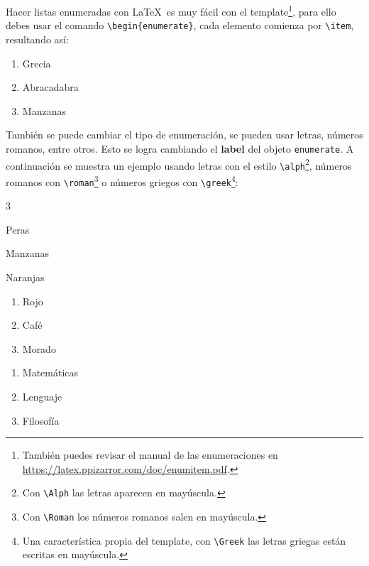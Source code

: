 

	Hacer listas enumeradas con \LaTeX\ es muy fácil con el template\footnote{También puedes revisar el manual de las enumeraciones en \url{https://latex.ppizarror.com/doc/enumitem.pdf}.}, para ello debes usar el comando \texttt{\textbackslash begin\{enumerate\}}, cada elemento comienza por \texttt{\textbackslash item}, resultando así:

	\begin{enumerate}
		\item Grecia
		\item Abracadabra
		\item Manzanas
	\end{enumerate}

	También se puede cambiar el tipo de enumeración, se pueden usar letras, números romanos, entre otros. Esto se logra cambiando el \textbf{label} del objeto \texttt{enumerate}. A continuación se muestra un ejemplo usando letras con el estilo \texttt{\textbackslash alph}\footnote{Con \texttt{\textbackslash Alph} las letras aparecen en mayúscula.}, números romanos con \texttt{\textbackslash roman}\footnote{Con \texttt{\textbackslash Roman} los números romanos salen en mayúscula.} o números griegos con \texttt{\textbackslash greek}\footnote{Una característica propia del template, con \texttt{\textbackslash Greek} las letras griegas están escritas en mayúscula.}:

	\begin{multicols}{3}
		\begin{enumeratebf}[label=\alph*) ] %
			\item Peras
			\item Manzanas
			\item Naranjas
		\end{enumeratebf}

		\begin{enumerate}[label=\roman*) ]
			\item Rojo
			\item Café
			\item Morado
		\end{enumerate}

		\begin{enumerate}[label=\greek*) ]
			\item Matemáticas
			\item Lenguaje
			\item Filosofía
		\end{enumerate}
	\end{multicols}

